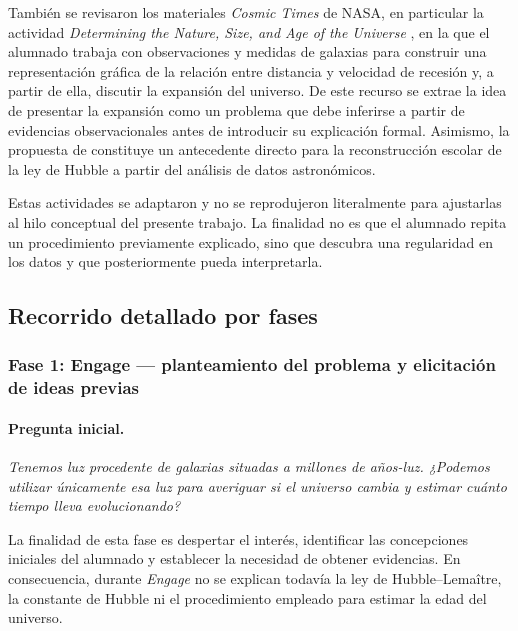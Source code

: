 También se revisaron los materiales \textit{Cosmic Times} de NASA, en particular la actividad \textit{Determining the Nature, Size, and Age of the Universe} \parencite{NASACosmicTimes1929}, en la que el alumnado trabaja con observaciones y medidas de galaxias para construir una representación gráfica de la relación entre distancia y velocidad de recesión y, a partir de ella, discutir la expansión del universo. De este recurso se extrae la idea de presentar la expansión como un problema que debe inferirse a partir de evidencias observacionales antes de introducir su explicación formal. Asimismo, la propuesta de \textcite{cardona2016} constituye un antecedente directo para la reconstrucción escolar de la ley de Hubble a partir del análisis de datos astronómicos.

Estas actividades se adaptaron y no se reprodujeron literalmente para ajustarlas al hilo conceptual del presente trabajo. La finalidad no es que el alumnado repita un procedimiento previamente explicado, sino que descubra una regularidad en los datos y que posteriormente pueda interpretarla.

\subsection{Recorrido detallado por fases}\label{sec:recorrido-fases}

\subsubsection{Fase 1: Engage --- planteamiento del problema y elicitación de ideas previas}\label{sec:engage}

\paragraph{Pregunta inicial.} \emph{Tenemos luz procedente de galaxias situadas a millones de años-luz. ¿Podemos utilizar únicamente esa luz para averiguar si el universo cambia y estimar cuánto tiempo lleva evolucionando?}

La finalidad de esta fase es despertar el interés, identificar las concepciones iniciales del alumnado y establecer la necesidad de obtener evidencias. En consecuencia, durante \textit{Engage} no se explican todavía la ley de Hubble--Lemaître, la constante de Hubble ni el procedimiento empleado para estimar la edad del universo.

